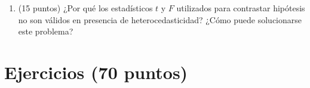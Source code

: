 \documentclass[10pt,a4paper]{article}
\begin{document}
\begin{enumerate}
\item (15 puntos) ¿Por qué los estadísticos \(t\) y \(F\) utilizados para contrastar hipótesis no son válidos en presencia de heterocedasticidad?
¿Cómo puede solucionarse este problema?


 \end{enumerate}



\section{Ejercicios (70 puntos)}
\end{document}
